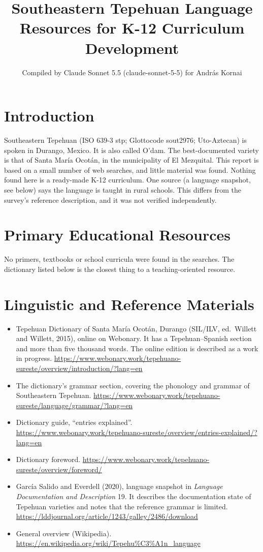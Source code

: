 \documentclass[12pt]{article}
\title{Southeastern Tepehuan Language Resources for K-12 Curriculum Development}
\author{Compiled by Claude Sonnet 5.5 (claude-sonnet-5-5) for Andr\'as Kornai}
\date{}
\begin{document}
\maketitle

\section{Introduction}
Southeastern Tepehuan (ISO 639-3 stp; Glottocode sout2976; Uto-Aztecan) is spoken in Durango, Mexico. It is also called O'dam. The best-documented variety is that of Santa Mar\'ia Ocot\'an, in the municipality of El Mezquital. This report is based on a small number of web searches, and little material was found. Nothing found here is a ready-made K-12 curriculum. One source (a language snapshot, see below) says the language is taught in rural schools. This differs from the survey's reference description, and it was not verified independently.

\section{Primary Educational Resources}
No primers, textbooks or school curricula were found in the searches. The dictionary listed below is the closest thing to a teaching-oriented resource.

\section{Linguistic and Reference Materials}
\begin{itemize}
\item Tepehuan Dictionary of Santa Mar\'ia Ocot\'an, Durango (SIL/ILV, ed.\ Willett and Willett, 2015), online on Webonary. It has a Tepehuan--Spanish section and more than five thousand words. The online edition is described as a work in progress. \url{https://www.webonary.work/tepehuano-sureste/overview/introduction/?lang=en}
\item The dictionary's grammar section, covering the phonology and grammar of Southeastern Tepehuan. \url{https://www.webonary.work/tepehuano-sureste/language/grammar/?lang=en}
\item Dictionary guide, ``entries explained''. \url{https://www.webonary.work/tepehuano-sureste/overview/entries-explained/?lang=en}
\item Dictionary foreword. \url{https://www.webonary.work/tepehuano-sureste/overview/foreword/}
\item Garc\'ia Salido and Everdell (2020), language snapshot in \emph{Language Documentation and Description} 19. It describes the documentation state of Tepehuan varieties and notes that the reference grammar is limited. \url{https://lddjournal.org/article/1243/galley/2486/download}
\item General overview (Wikipedia). \url{https://en.wikipedia.org/wiki/Tepehu%C3%A1n_language}
\end{itemize}
\end{document}

